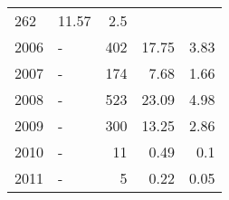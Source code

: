 \begin{longtable}{lXrrr}
       \num{262} &
       \num[round-mode=places,round-precision=2]{11.57} &
         \num[round-mode=places,round-precision=2]{2.5} \\

     2006 &
     \multicolumn{1}{X}{ -  } &


       \num{402} &
       \num[round-mode=places,round-precision=2]{17.75} &
         \num[round-mode=places,round-precision=2]{3.83} \\

     2007 &
     \multicolumn{1}{X}{ -  } &


       \num{174} &
       \num[round-mode=places,round-precision=2]{7.68} &
         \num[round-mode=places,round-precision=2]{1.66} \\

     2008 &
     \multicolumn{1}{X}{ -  } &


       \num{523} &
       \num[round-mode=places,round-precision=2]{23.09} &
         \num[round-mode=places,round-precision=2]{4.98} \\

     2009 &
     \multicolumn{1}{X}{ -  } &


       \num{300} &
       \num[round-mode=places,round-precision=2]{13.25} &
         \num[round-mode=places,round-precision=2]{2.86} \\

     2010 &
     \multicolumn{1}{X}{ -  } &


       \num{11} &
       \num[round-mode=places,round-precision=2]{0.49} &
         \num[round-mode=places,round-precision=2]{0.1} \\

     2011 &
     \multicolumn{1}{X}{ -  } &


       \num{5} &
       \num[round-mode=places,round-precision=2]{0.22} &
         \num[round-mode=places,round-precision=2]{0.05} \\


\end{longtable}
